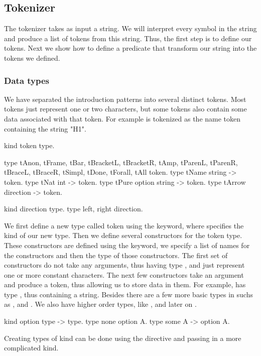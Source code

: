 \documentclass[thesis.tex]{subfiles}
\begin{document}
{{\subsection{Tokenizer}\label{ssec:tokenizer}
The tokenizer takes as input a string. We will interpret every symbol in the string and produce a list of tokens from this string. Thus, the first step is to define our tokens. Next we show how to define a predicate that transform our string into the tokens we defined.

\subsubsection{Data types}\label{sssec:datatypes}
We have separated the introduction patterns into several distinct tokens. Most tokens just represent one or two characters, but some tokens also contain some data associated with that token. For example  is tokenized as the name token containing the string "H1".
\begin{elpicode}
  kind token type.

  type tAnon, tFrame, tBar, tBracketL, tBracketR, tAmp,
       tParenL, tParenR, tBraceL, tBraceR, tSimpl,
       tDone, tForall, tAll token.
  type tName string -> token.
  type tNat int -> token.
  type tPure option string -> token.
  type tArrow direction -> token.

  kind direction type.
  type left, right direction.
\end{elpicode}
We first define a new type called token using the  keyword, where  specifies the kind of our new type. Then we define several constructors for the token type. These constructors are defined using the  keyword, we specify a list of names for the constructors and then the type of those constructors. The first set of constructors do not take any arguments, thus having type , and just represent one or more constant characters. The next few constructors take an argument and produce a token, thus allowing us to store data in them. For example,  has type , thus containing a string. Besides  there are a few more basic types in \elpi suchs as ,  and . We also have higher order types, like , and later on .
\begin{elpicode}
  kind option type -> type.
  type none option A.
  type some A -> option A.
\end{elpicode}
Creating types of kind  can be done using the  directive and passing in a more complicated kind.

}}
\end{document}
